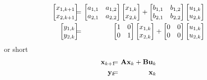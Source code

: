 \begin{eqnarray*}
\begin{bmatrix}
	x_{1,k+1}
	\\
	x_{2,k+1}
\end{bmatrix}
	\mkern-11.5mu&=&\mkern-11.5mu
\begin{bmatrix}
	a_{1,1} & a_{1,2}
	\\
	a_{2,1} & a_{2,2}
\end{bmatrix}
\begin{bmatrix}
	x_{1,k}
	\\
	x_{2,k}
\end{bmatrix}
+
\begin{bmatrix}
	b_{1,1} & b_{1,2}
	\\
	b_{2,1} & b_{2,2}
\end{bmatrix}
\begin{bmatrix}
	u_{1,k}
	\\
	u_{2,k}
\end{bmatrix}
\\
\begin{bmatrix}
	y_{1,k}
	\\
	y_{2,k}
\end{bmatrix}
	\mkern-11.5mu&=&\mkern-11.5mu
\begin{bmatrix}
	1 & 0
	\\
	0 & 1
\end{bmatrix}
\begin{bmatrix}
	x_{1,k}
	\\
	x_{2,k}
\end{bmatrix}
+
\begin{bmatrix}
	0 & 0
	\\
	0 & 0
\end{bmatrix}
\begin{bmatrix}
	u_{1,k}
	\\
	u_{2,k}
\end{bmatrix}
\end{eqnarray*}
or short
\begin{eqnarray*}
	\mathbf{x}_{k+1} \mkern-11.5mu&=&\mkern-11.5mu \mathbf{A} \mathbf{x}_k + \mathbf{B} \mathbf{u}_k
	\\
	\mathbf{y}_k \mkern-11.5mu&=&\mkern-11.5mu \mathbf{x}_k
\end{eqnarray*}